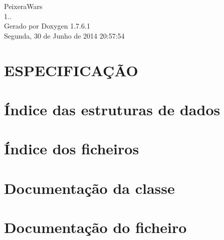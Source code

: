 \documentclass[a4paper]{book}
\begin{document}
\hypersetup{pageanchor=false,citecolor=blue}
\begin{titlepage}
\vspace*{7cm}
\begin{center}
{\Large \-Peixera\-Wars \\[1ex]\large 1.. }\\
\vspace*{1cm}
{\large \-Gerado por Doxygen 1.7.6.1}\\
\vspace*{0.5cm}
{\small Segunda, 30 de Junho de 2014 20:57:54}\\
\end{center}
\end{titlepage}
\clearemptydoublepage
{}
\tableofcontents
\clearemptydoublepage
{}
\hypersetup{pageanchor=true,citecolor=blue}
\chapter{\-E\-S\-P\-E\-C\-I\-F\-I\-C\-AÇÃ\-O}
\label{index}\hypertarget{index}{}
\chapter{Índice das estruturas de dados}

\chapter{Índice dos ficheiros}

\chapter{\-Documentação da classe}






\chapter{\-Documentação do ficheiro}








\printindex
\end{document}

